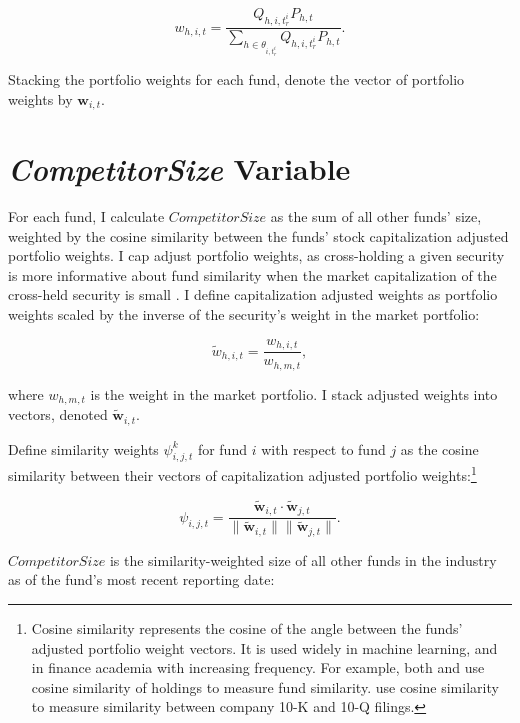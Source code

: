 \documentclass[openany]{book}
\let\rmarkdownfootnote\footnote%
\def\footnote{\protect\rmarkdownfootnote}
\theoremstyle{definition}
\theoremstyle{definition}
\theoremstyle{definition}
\theoremstyle{remark}
\begin{document}
\begin{equation}
w_{h,i,t} = \frac{Q_{h,i,t^i_r} P_{h,t} }{\sum_{h\in\theta_{i,t^i_r}} Q_{h,i,t^i_r} P_{h,t} }.
\end{equation}

Stacking the portfolio weights for each fund, denote the vector of
portfolio weights by \(\mathbf{w}_{i,t}\).

\section{\texorpdfstring{\emph{CompetitorSize}
Variable}{CompetitorSize Variable}}\label{sec:CompetitorSize}

For each fund, I calculate \(CompetitorSize\) as the sum of all other
funds' size, weighted by the cosine similarity between the funds' stock
capitalization adjusted portfolio weights. I cap adjust portfolio
weights, as cross-holding a given security is more informative about
fund similarity when the market capitalization of the cross-held
security is small \citep{ccp05}. I define capitalization adjusted
weights as portfolio weights scaled by the inverse of the security's
weight in the market portfolio:

\begin{equation}
\tilde{w}_{h,i,t} = \frac{w_{h,i,t}}{w_{h,m,t}},
\end{equation}

where \(w_{h,m,t}\) is the weight in the market portfolio. I stack
adjusted weights into vectors, denoted \(\mathbf{\tilde{w}}_{i,t}\).

Define similarity weights \(\psi_{i,j,t}^k\) for fund \(i\) with respect
to fund \(j\) as the cosine similarity between their vectors of
capitalization adjusted portfolio weights:\footnote{Cosine similarity
  represents the cosine of the angle between the funds' adjusted
  portfolio weight vectors. It is used widely in machine learning, and
  in finance academia with increasing frequency. For example, both
  \citet{blocher16} and \citet{hkp17} use cosine similarity of holdings
  to measure fund similarity. \citet{lmn16} use cosine similarity to
  measure similarity between company 10-K and 10-Q filings.}

\begin{equation}
\psi_{i,j,t} = \frac{ \mathbf{\tilde{w}}_{i,t} \cdot \mathbf{\tilde{w}}_{j,t} }{ \| \mathbf{\tilde{w}}_{i,t} \|  \| \mathbf{\tilde{w}}_{j,t} \| }.
\end{equation}

\(CompetitorSize\) is the similarity-weighted size of all other funds in
the industry as of the fund's most recent reporting date:
\end{document}
